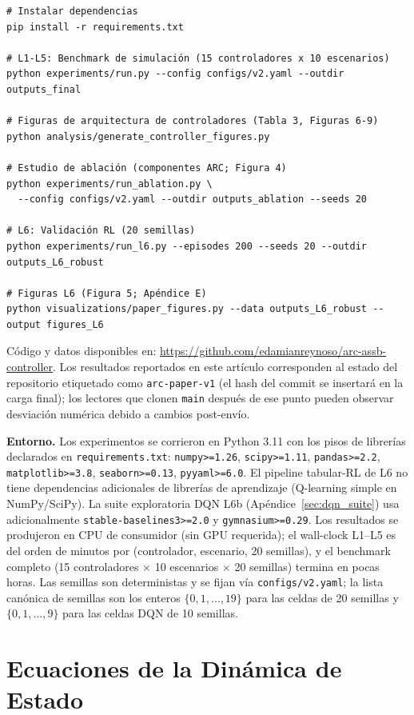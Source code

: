 \documentclass{article}
\begin{document}
\begin{verbatim}
# Instalar dependencias
pip install -r requirements.txt

# L1-L5: Benchmark de simulación (15 controladores x 10 escenarios)
python experiments/run.py --config configs/v2.yaml --outdir outputs_final

# Figuras de arquitectura de controladores (Tabla 3, Figuras 6-9)
python analysis/generate_controller_figures.py

# Estudio de ablación (componentes ARC; Figura 4)
python experiments/run_ablation.py \
  --config configs/v2.yaml --outdir outputs_ablation --seeds 20

# L6: Validación RL (20 semillas)
python experiments/run_l6.py --episodes 200 --seeds 20 --outdir outputs_L6_robust

# Figuras L6 (Figura 5; Apéndice E)
python visualizations/paper_figures.py --data outputs_L6_robust --output figures_L6
\end{verbatim}

Código y datos disponibles en: \url{https://github.com/edamianreynoso/arc-assb-controller}. Los resultados reportados en este artículo corresponden al estado del repositorio etiquetado como \texttt{arc-paper-v1} (el hash del commit se insertará en la carga final); los lectores que clonen \texttt{main} después de ese punto pueden observar desviación numérica debido a cambios post-envío.

\textbf{Entorno.} Los experimentos se corrieron en Python 3.11 con los pisos de librerías declarados en \texttt{requirements.txt}: \texttt{numpy>=1.26}, \texttt{scipy>=1.11}, \texttt{pandas>=2.2}, \texttt{matplotlib>=3.8}, \texttt{seaborn>=0.13}, \texttt{pyyaml>=6.0}. El pipeline tabular-RL de L6 no tiene dependencias adicionales de librerías de aprendizaje (Q-learning simple en NumPy/SciPy). La suite exploratoria DQN L6b (Apéndice~\ref{sec:dqn_suite}) usa adicionalmente \texttt{stable-baselines3>=2.0} y \texttt{gymnasium>=0.29}. Los resultados se produjeron en CPU de consumidor (sin GPU requerida); el wall-clock L1--L5 es del orden de minutos por (controlador, escenario, 20 semillas), y el benchmark completo (15 controladores $\times$ 10 escenarios $\times$ 20 semillas) termina en pocas horas. Las semillas son deterministas y se fijan vía \texttt{configs/v2.yaml}; la lista canónica de semillas son los enteros $\{0, 1, \ldots, 19\}$ para las celdas de 20 semillas y $\{0, 1, \ldots, 9\}$ para las celdas DQN de 10 semillas.

\section{Ecuaciones de la Dinámica de Estado}
\end{document}
